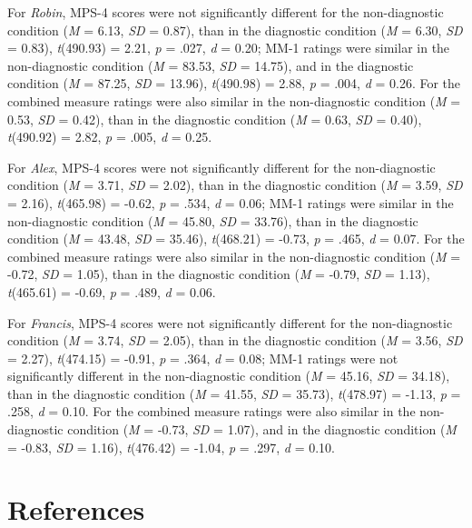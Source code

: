 \documentclass[
  man,floatsintext]{apa6}
\begin{document}
For \emph{Robin}, MPS-4 scores were not significantly different for the non-diagnostic condition (\emph{M} = 6.13, \emph{SD} = 0.87), than in the diagnostic condition (\emph{M} = 6.30, \emph{SD} = 0.83), \emph{t}(490.93) = 2.21, \emph{p} = .027, \emph{d} = 0.20; MM-1 ratings were similar in the non-diagnostic condition (\emph{M} = 83.53, \emph{SD} = 14.75), and in the diagnostic condition (\emph{M} = 87.25, \emph{SD} = 13.96), \emph{t}(490.98) = 2.88, \emph{p} = .004, \emph{d} = 0.26. For the combined measure ratings were also similar in the non-diagnostic condition (\emph{M} = 0.53, \emph{SD} = 0.42), than in the diagnostic condition (\emph{M} = 0.63, \emph{SD} = 0.40), \emph{t}(490.92) = 2.82, \emph{p} = .005, \emph{d} = 0.25.

For \emph{Alex}, MPS-4 scores were not significantly different for the non-diagnostic condition (\emph{M} = 3.71, \emph{SD} = 2.02), than in the diagnostic condition (\emph{M} = 3.59, \emph{SD} = 2.16), \emph{t}(465.98) = -0.62, \emph{p} = .534, \emph{d} = 0.06; MM-1 ratings were similar in the non-diagnostic condition (\emph{M} = 45.80, \emph{SD} = 33.76), than in the diagnostic condition (\emph{M} = 43.48, \emph{SD} = 35.46), \emph{t}(468.21) = -0.73, \emph{p} = .465, \emph{d} = 0.07. For the combined measure ratings were also similar in the non-diagnostic condition (\emph{M} = -0.72, \emph{SD} = 1.05), than in the diagnostic condition (\emph{M} = -0.79, \emph{SD} = 1.13), \emph{t}(465.61) = -0.69, \emph{p} = .489, \emph{d} = 0.06.

For \emph{Francis}, MPS-4 scores were not significantly different for the non-diagnostic condition (\emph{M} = 3.74, \emph{SD} = 2.05), than in the diagnostic condition (\emph{M} = 3.56, \emph{SD} = 2.27), \emph{t}(474.15) = -0.91, \emph{p} = .364, \emph{d} = 0.08; MM-1 ratings were not significantly different in the non-diagnostic condition (\emph{M} = 45.16, \emph{SD} = 34.18), than in the diagnostic condition (\emph{M} = 41.55, \emph{SD} = 35.73), \emph{t}(478.97) = -1.13, \emph{p} = .258, \emph{d} = 0.10. For the combined measure ratings were also similar in the non-diagnostic condition (\emph{M} = -0.73, \emph{SD} = 1.07), and in the diagnostic condition (\emph{M} = -0.83, \emph{SD} = 1.16), \emph{t}(476.42) = -1.04, \emph{p} = .297, \emph{d} = 0.10.

\pagebreak

\section*{References}\label{references}
\end{document}

